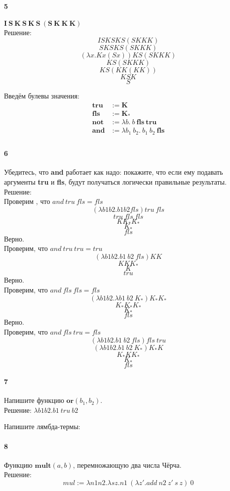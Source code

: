 \documentclass[12pt, a4paper] {article}
\begin{document}
\paragraph{5} $\mathbf{I}~\mathbf{S}~\mathbf{K}~\mathbf{S}~\mathbf{K}~\mathbf{S}~(
    \mathbf{S}~\mathbf{K}~\mathbf{K}~\mathbf{K})$ \\
Решение:
 	$$ ISKSKS(SKKK) $$
 	$$ SKSKS(SKKK) $$
 	$$ (\lambda x.K x (S x))KS(SKKK) $$
 	$$ KS(SKKK) $$
 	$$ KS(KK(KK)) $$
 	$$ KSK $$
 	$$ S $$
 	
    
Введём булевы значения:
$$\begin{aligned}
\mathbf{tru} &:= \mathbf{K} \\
\mathbf{fls} &:= \mathbf{K_\ast} \\
\mathbf{not} &:= \lambda b.~b~\mathbf{fls}~\mathbf{tru} \\
\mathbf{and} &:= \lambda b_1~b_2.~b_1~b_2~\mathbf{fls} \\
\end{aligned}$$

\paragraph{6} Убедитесь, что \textbf{and} работает как надо: покажите, что если ему подавать аргументы \textbf{tru} и \textbf{fls}, будут получаться логически правильные результаты. \\
Решение: \\
 Проверим , что $ and\  tru\ fls = fls $
 $$ (\lambda b1b2. b1 b2 fls) tru\ fls $$
 $$ tru\ fls\ fls $$
 $$ K K_* K_* $$
 $$ K_* $$
 $$ fls $$
 Верно. \\
 Проверим, что $and\ tru\ tru = tru $
 $$ (\lambda b1b2. b1\ b2\ fls) K K $$
 $$ K K K_* $$
 $$ K $$
 $$ tru $$
Верно. \\
Проверим, что $ and\ fls\ fls = fls $
$$ (\lambda b1b2.\lambda b1\ b2\ K_*)K_* K_* $$
$$ K_* K_* K_* $$
$$ K_* $$
$$ fls $$
Верно. \\
Проверим, что $and\ fls\ tru = fls$
$$ (\lambda b1b2. b1\ b2\ fls)fls\ tru $$
$$ (\lambda b1b2. b1\ b2\ K_*)K_* K $$
$$ K_* K K_* $$
$$ K_* $$
$$ fls $$

\paragraph{7} Напишите функцию $\textbf{or}(b_1, b_2)$. \\
Решение: $ \lambda b1b2. b1\ tru \ b2 $

Напишите лямбда-термы:
  \paragraph{8} Функцию $\mathbf{mult}(a, b)$, перемножающую два числа Чёрча. \\
  Решение: 
  $$ mul := \lambda n1 n2. \lambda sz. n1\ (\lambda z'. add\ n2\ z'\ s\ z)\ 0 $$
\end{document}
